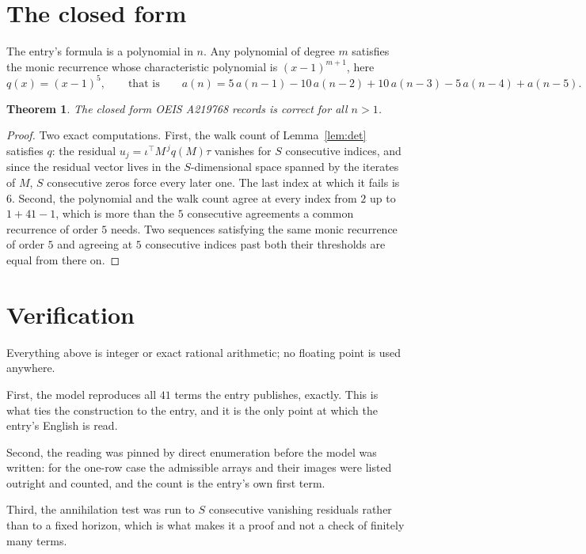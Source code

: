 \documentclass[11pt,a4paper]{article}
\theoremstyle{plain}
\newtheorem{theorem}{Theorem}
\theoremstyle{definition}
\begin{document}
\section{The closed form}

The entry's formula is a polynomial in $n$. Any polynomial of degree $m$ satisfies the monic
recurrence whose characteristic polynomial is $(x-1)^{m+1}$, here
\[
q(x)=(x-1)^{5},\qquad\text{that is}\qquad a(n)=5\,a(n-1) - 10\,a(n-2) + 10\,a(n-3) - 5\,a(n-4) + a(n-5).
\]

\begin{theorem}
The closed form OEIS A219768 records is correct for all $n>1$.
\end{theorem}

\begin{proof}
Two exact computations. First, the walk count of Lemma~\ref{lem:det} satisfies $q$: the
residual $u_j=\iota^{\!\top}M^{\,j}q(M)\tau$ vanishes for $S$ consecutive indices, and
since the residual vector lives in the $S$-dimensional space spanned by the iterates of $M$,
$S$ consecutive zeros force every later one. The last index at which it fails is $6$.
Second, the polynomial and the walk count agree at every index from $2$ up to
$1 + 41 - 1$, which is more than the $5$ consecutive agreements a
common recurrence of order $5$ needs. Two sequences satisfying the same monic recurrence
of order $5$ and agreeing at $5$ consecutive indices past both their thresholds are
equal from there on.
\end{proof}

\section{Verification}

Everything above is integer or exact rational arithmetic; no floating point is used anywhere.

First, the model reproduces all $41$ terms the entry publishes, exactly. This is what
ties the construction to the entry, and it is the only point at which the entry's English is
read.

Second, the reading was pinned by direct enumeration before the model was written: for the
one-row case the admissible arrays and their images were listed outright and counted, and the
count is the entry's own first term.

Third, the annihilation test was run to $S$ consecutive vanishing residuals rather than to a
fixed horizon, which is what makes it a proof and not a check of finitely many terms.
\end{document}
